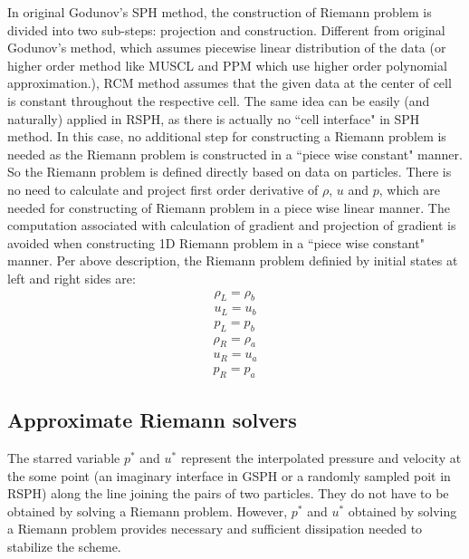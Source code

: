 \documentclass[review]{elsarticle}
\begin{document}
In original Godunov's SPH method, the construction of Riemann problem is divided into two sub-steps: projection and construction. 
Different from original Godunov's method, which assumes piecewise linear distribution of the data (or higher order method like MUSCL and PPM which use higher order polynomial approximation.), RCM method assumes that the given data at the center of cell is constant throughout the respective cell. The same idea can be easily (and naturally) applied in RSPH, as there is actually no ``cell interface" in SPH method.
In this case, no additional step for constructing a Riemann problem is needed as the Riemann problem is constructed in a ``piece wise constant" manner. So the Riemann problem is defined directly based on data on particles. There is no need to calculate and project first order derivative of $\rho$, $u$ and $p$, which are needed for constructing of Riemann problem in a piece wise linear manner. The computation associated with calculation of gradient and projection of gradient is avoided when constructing 1D Riemann problem in a ``piece wise constant" manner.
Per above description, the Riemann problem definied by initial states at left and right sides are: 
\begin{eqnarray}
\rho_L = \rho_b 
\label{eq:Riemann-Prob-define-L-rho} \\
u_L = u_b 
\label{eq:Riemann-Prob-define-L-v} \\
p_L = p_b 
\label{eq:Riemann-Prob-define-L-p}
\end{eqnarray}
\begin{eqnarray}
\rho_R = \rho_a 
\label{eq:Riemann-Prob-define-R-rho} \\
u_R = u_a 
\label{eq:Riemann-Prob-define-R-v} \\
p_R = p_a 
\label{eq:Riemann-Prob-define-R-p}
\end{eqnarray}

\subsection{Approximate Riemann solvers}
The starred variable $p^{\ast}$ and $u^{\ast}$ represent the interpolated pressure and velocity at the some point (an imaginary interface in GSPH or a randomly sampled poit in RSPH) along the line joining the pairs of two particles. They do not have to be obtained by solving a Riemann problem. However, $p^{\ast}$ and $u^{\ast}$ obtained by solving a Riemann problem provides necessary and sufficient dissipation needed to stabilize the scheme.
\end{document}
